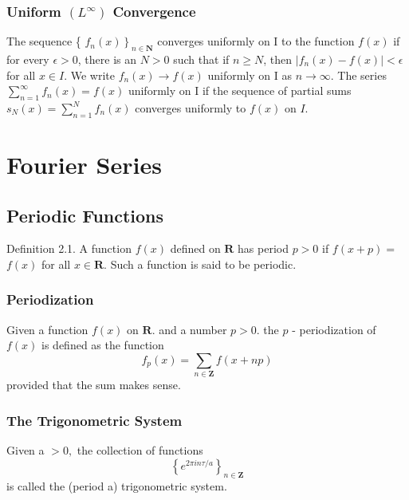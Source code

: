 \subsubsection{Uniform $(L^{\infty})$ Convergence}
\begin{definition}
 
The sequence \{ $\left.f_{n}(x)\right\}_{n \in \mathbf{N}}$ converges uniformly on I to the
function $f(x)$ if for every $\epsilon>0$, there is an $N>0$ such that if $n \geq N$, then
$\left|f_{n}(x)-f(x)\right|<\epsilon$ for all $x \in I .$ We write $f_{n}(x) \rightarrow f(x)$ uniformly on I as
$n \rightarrow \infty$.
The series $\sum_{n=1}^{\infty} f_{n}(x)=f(x)$ uniformly on I if the sequence of partial sums
$s_{N}(x)=\sum_{n=1}^{N} f_{n}(x)$ converges uniformly to $f(x)$ on $I .$
\end{definition}


\section{Fourier Series}

\subsection{Periodic Functions}

\begin{definition}
Definition 2.1. A function $f(x)$ defined on $\mathbf{R}$ has period $p>0$ if $f(x+p)=$
$f(x)$ for all $x \in \mathbf{R} .$ Such a function is said to be periodic.
\end{definition}

\subsubsection{Periodization}
\begin{definition}
Given a function $f(x)$ on $\mathbf{R} .$ and a number $p>0 .$ the $p$ -
periodization of $f(x)$ is defined as the function
$$
f_{p}(x)=\sum_{n \in \mathbf{Z}} f(x+n p)
$$
provided that the sum makes sense.

\end{definition}

\subsubsection{The Trigonometric System}
\begin{definition}
Given a $>0,$ the collection of functions
$$
\left\{e^{2 \pi i n \tau / a}\right\}_{n \in \mathbf{Z}}
$$
is called the (period a) trigonometric system.
\end{definition}

